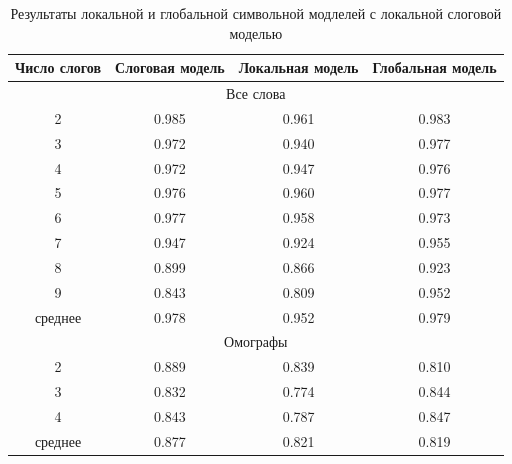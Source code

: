 \documentclass[14pt, a4paper, russian]{extreport}
\begin{document}
\begin{table}[H]
		\caption{Результаты локальной и глобальной символьной модлелей с локальной слоговой моделью}
	
	\begin{small}
		\begin{center}
			\begin{tabular}{|c|c|c|c|}
				\hline
				Число слогов & Слоговая модель & Локальная модель & Глобальная модель \\ \hline
				\multicolumn{4}{|c|}{Все слова}                                       \\ \hline
				     2       &      0.985      &      0.961       & 0.983             \\ \hline
				     3       &      0.972      &      0.940       & 0.977             \\ \hline
				     4       &      0.972      &      0.947       & 0.976             \\ \hline
				     5       &      0.976      &      0.960       & 0.977             \\ \hline
				     6       &      0.977      &      0.958       & 0.973             \\ \hline
				     7       &      0.947      &      0.924       & 0.955             \\ \hline
				     8       &      0.899      &      0.866       & 0.923             \\ \hline
				     9       &      0.843      &      0.809       & 0.952             \\ \hline
				  среднее    &      0.978      &      0.952       & 0.979             \\ \hline
				  \multicolumn{4}{|c|}{Омографы}                                        \\ \hline
				  
				     2       &      0.889      &      0.839       & 0.810             \\ \hline
				     3       &      0.832      &      0.774       & 0.844             \\ \hline
				     4       &      0.843      &      0.787       & 0.847             \\ \hline
				  среднее    &      0.877      &      0.821       & 0.819             \\ \hline
			\end{tabular}
		\end{center}
	\end{small}
	\label{table:local_syl}
\end{table}
\end{document}
